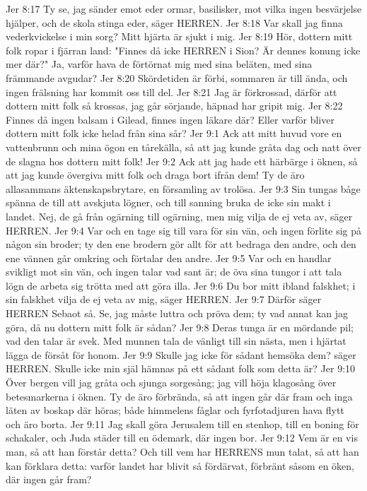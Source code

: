 Jer 8:17  Ty se, jag sänder emot eder ormar, basilisker, mot vilka ingen besvärjelse hjälper, och de skola stinga eder, säger HERREN.
Jer 8:18  Var skall jag finna vederkvickelse i min sorg? Mitt hjärta är sjukt i mig.
Jer 8:19  Hör, dottern mitt folk ropar i fjärran land: "Finnes då icke HERREN i Sion? Är dennes konung icke mer där?" Ja, varför hava de förtörnat mig med sina beläten, med sina främmande avgudar?
Jer 8:20  Skördetiden är förbi, sommaren är till ända, och ingen frälsning har kommit oss till del.
Jer 8:21  Jag är förkrossad, därför att dottern mitt folk så krossas, jag går sörjande, häpnad har gripit mig.
Jer 8:22  Finnes då ingen balsam i Gilead, finnes ingen läkare där? Eller varför bliver dottern mitt folk icke helad från sina sår?
Jer 9:1  Ack att mitt huvud vore en vattenbrunn och mina ögon en tårekälla, så att jag kunde gråta dag och natt över de slagna hos dottern mitt folk!
Jer 9:2  Ack att jag hade ett härbärge i öknen, så att jag kunde övergiva mitt folk och draga bort ifrån dem! Ty de äro allasammans äktenskapsbrytare, en församling av trolösa.
Jer 9:3  Sin tungas båge spänna de till att avskjuta lögner, och till sanning bruka de icke sin makt i landet. Nej, de gå från ogärning till ogärning, men mig vilja de ej veta av, säger HERREN.
Jer 9:4  Var och en tage sig till vara för sin vän, och ingen förlite sig på någon sin broder; ty den ene brodern gör allt för att bedraga den andre, och den ene vännen går omkring och förtalar den andre.
Jer 9:5  Var och en handlar svikligt mot sin vän, och ingen talar vad sant är; de öva sina tungor i att tala lögn de arbeta sig trötta med att göra illa.
Jer 9:6  Du bor mitt ibland falskhet; i sin falskhet vilja de ej veta av mig, säger HERREN.
Jer 9:7  Därför säger HERREN Sebaot så. Se, jag måste luttra och pröva dem; ty vad annat kan jag göra, då nu dottern mitt folk är sådan?
Jer 9:8  Deras tunga är en mördande pil; vad den talar är svek. Med munnen tala de vänligt till sin nästa, men i hjärtat lägga de försåt för honom.
Jer 9:9  Skulle jag icke för sådant hemsöka dem? säger HERREN. Skulle icke min själ hämnas på ett sådant folk som detta är?
Jer 9:10  Över bergen vill jag gråta och sjunga sorgesång; jag vill höja klagosång över betesmarkerna i öknen. Ty de äro förbrända, så att ingen går där fram och inga läten av boskap där höras; både himmelens fåglar och fyrfotadjuren hava flytt och äro borta.
Jer 9:11  Jag skall göra Jerusalem till en stenhop, till en boning för schakaler, och Juda städer till en ödemark, där ingen bor.
Jer 9:12  Vem är en vis man, så att han förstår detta? Och till vem har HERRENS mun talat, så att han kan förklara detta: varför landet har blivit så fördärvat, förbränt såsom en öken, där ingen går fram?
